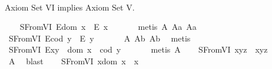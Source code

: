 \begin{isabellebody}
\isadelimproof
\ %
\endisadelimproof
%
\isatagproof
{}\isamarkupfalse%
%
\endisatagproof
{\isafoldproof}%
%
\isadelimproof
%
\endisadelimproof
%
\begin{isamarkuptext}%
Axiom Set VI implies Axiom Set V.%
\end{isamarkuptext}\isamarkuptrue%
\ \ \isamarkupfalse%
\ S{}FromVI{\isacharcolon}\ {\isachardoublequoteopen}E{\isacharparenleft}dom\ x{\isacharparenright}\ \isactrlbold {\isasymrightarrow}\ E\ x{\isachardoublequoteclose}\ \isanewline
%
\isadelimproof
\ \ \ \ %
\endisadelimproof
%
\isatagproof
{}\isamarkupfalse%
\ {\isacharparenleft}metis\ A{}\ A{}a\ A{}a{\isacharparenright}%
\endisatagproof
{\isafoldproof}%
%
\isadelimproof
\isanewline
%
\endisadelimproof
\ \ \isamarkupfalse%
\ S{}FromVI{\isacharcolon}\ {\isachardoublequoteopen}E{\isacharparenleft}cod\ y{\isacharparenright}\ \isactrlbold {\isasymrightarrow}\ E\ y{\isachardoublequoteclose}\ \isanewline
%
\isadelimproof
\ \ \ \ %
\endisadelimproof
%
\isatagproof
{}\isamarkupfalse%
\ A{}\ A{}b\ A{}b\ \isamarkupfalse%
\ metis%
\endisatagproof
{\isafoldproof}%
%
\isadelimproof
\isanewline
%
\endisadelimproof
\ \ \isamarkupfalse%
\ S{}FromVI{\isacharcolon}\ {\isachardoublequoteopen}E{\isacharparenleft}x{\isasymcdot}y{\isacharparenright}\ \isactrlbold {\isasymleftrightarrow}\ dom\ x\ {\isasymsimeq}\ cod\ y{\isachardoublequoteclose}\ \isanewline
%
\isadelimproof
\ \ \ \ %
\endisadelimproof
%
\isatagproof
{}\isamarkupfalse%
\ {\isacharparenleft}metis\ A{}{\isacharparenright}%
\endisatagproof
{\isafoldproof}%
%
\isadelimproof
\isanewline
%
\endisadelimproof
\ \ \isamarkupfalse%
\ S{}FromVI{\isacharcolon}\ {\isachardoublequoteopen}x{\isasymcdot}{\isacharparenleft}y{\isasymcdot}z{\isacharparenright}\ {\isasymcong}\ {\isacharparenleft}x{\isasymcdot}y{\isacharparenright}{\isasymcdot}z{\isachardoublequoteclose}\ \isanewline
%
\isadelimproof
\ \ \ \ %
\endisadelimproof
%
\isatagproof
{}\isamarkupfalse%
\ A{}\ \isamarkupfalse%
\ blast%
\endisatagproof
{\isafoldproof}%
%
\isadelimproof
\isanewline
%
\endisadelimproof
\ \ \isamarkupfalse%
\ S{}FromVI{\isacharcolon}\ {\isachardoublequoteopen}x{\isasymcdot}{\isacharparenleft}dom\ x{\isacharparenright}\ {\isasymcong}\ x{\isachardoublequoteclose}\ \isanewline

\end{isabellebody}
